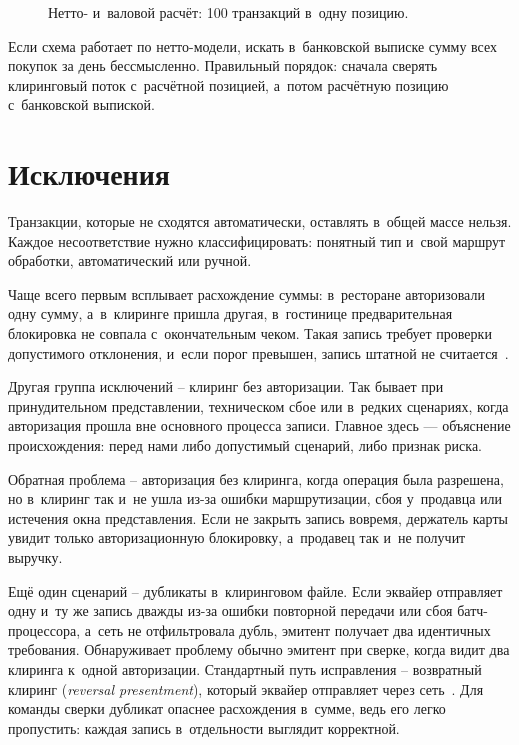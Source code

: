 \begin{figure}[tbp]
  \centering
  \caption{Нетто- и~валовой расчёт: 100 транзакций в~одну позицию.}\label{fig:net-vs-gross}
\end{figure}

Если схема работает по нетто-модели, искать в~банковской выписке сумму
всех покупок за день бессмысленно. Правильный порядок:
сначала сверять клиринговый поток с~расчётной позицией,
а~потом расчётную позицию с~банковской выпиской.

\section{Исключения}\label{sec:recon-exceptions}

Транзакции, которые не сходятся автоматически, оставлять в~общей
массе нельзя. Каждое несоответствие нужно классифицировать: понятный тип и~свой маршрут обработки, автоматический или ручной.

Чаще всего первым всплывает расхождение суммы: в~ресторане
авторизовали одну сумму, а~в~клиринге пришла другая, в~гостинице
предварительная блокировка не совпала с~окончательным чеком. Такая
запись требует проверки допустимого отклонения,
и~если порог превышен, запись штатной не считается~\cite{visa-core-rules}.

Другая группа исключений -- клиринг без авторизации. Так бывает при
принудительном представлении, техническом сбое или в~редких сценариях,
когда авторизация прошла вне основного процесса записи. Главное здесь — объяснение происхождения: перед нами либо допустимый сценарий,
либо признак риска.

Обратная проблема -- авторизация без клиринга, когда операция была разрешена,
но в~клиринг так и~не ушла из-за ошибки маршрутизации,
сбоя у~продавца или истечения окна представления. Если не закрыть запись
вовремя, держатель карты увидит только авторизационную
блокировку, а~продавец так и~не получит выручку.

Ещё один сценарий -- дубликаты в~клиринговом файле. Если
эквайер отправляет одну и~ту же запись дважды из-за ошибки
повторной передачи или сбоя батч-процессора, а~сеть не
отфильтровала дубль, эмитент получает два идентичных
требования. Обнаруживает проблему обычно эмитент при сверке,
когда видит два клиринга к~одной авторизации. Стандартный путь
исправления -- возвратный клиринг (\textit{reversal presentment}),
который эквайер отправляет через сеть~\cite{visa-core-rules}.
Для команды сверки дубликат опаснее расхождения в~сумме,
ведь его легко пропустить: каждая запись в~отдельности
выглядит корректной.

